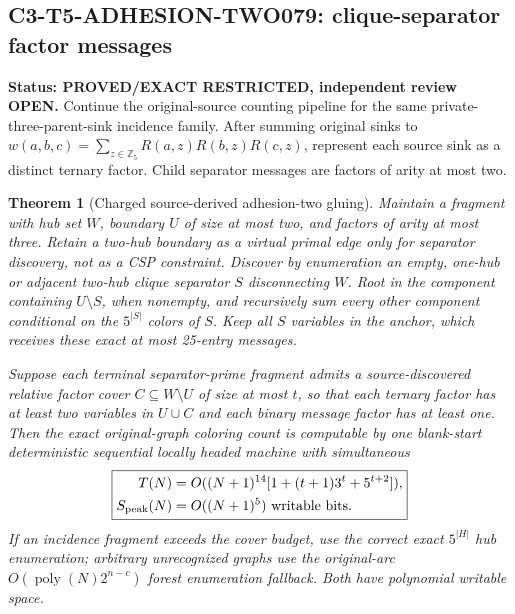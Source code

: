 \documentclass[11pt]{article}
\newtheorem{theorem}{Theorem}
\begin{document}
\subsection*{C3-T5-ADHESION-TWO079: clique-separator factor messages}

\noindent\textbf{Status: PROVED/EXACT RESTRICTED, independent review OPEN.}
Continue the original-source counting pipeline for the same
private-three-parent-sink incidence family. After summing
original sinks to $w(a,b,c)=\sum_{z\in\mathbb Z_5}
R(a,z)R(b,z)R(c,z)$, represent each source sink as a distinct
ternary factor. Child separator messages are factors of
arity at most two.

\begin{theorem}[Charged source-derived adhesion-two gluing]
Maintain a fragment with hub set $W$, boundary $U$ of
size at most two, and factors of arity at most three.
Retain a two-hub boundary as a virtual primal edge only for
separator discovery, not as a CSP constraint. Discover by
enumeration an empty, one-hub or adjacent two-hub clique
separator $S$ disconnecting $W$. Root in the component
containing $U\setminus S$, when nonempty, and recursively
sum every other component conditional on the $5^{|S|}$
colors of $S$. Keep all $S$ variables in the anchor,
which receives these exact at most 25-entry messages.

Suppose each terminal separator-prime fragment admits a
source-discovered relative factor cover
$C\subseteq W\setminus U$ of size at most $t$, so that
each ternary factor has at least two variables in $U\cup C$
and each binary message factor has at least one.
Then the exact original-graph coloring count is computable
by one blank-start deterministic sequential locally headed
machine with simultaneous
\[
\boxed{\begin{aligned}
T(N)&=O((N+1)^{14}[1+(t+1)3^t+5^{t+2}]),\\
S_{\rm peak}(N)&=O((N+1)^5)\text{ writable bits}.
\end{aligned}}
\]
If an incidence fragment exceeds the cover budget, use the
correct exact $5^{|H|}$ hub enumeration; arbitrary unrecognized
graphs use the original-arc $O(\operatorname{poly}(N)2^{n-c})$
forest enumeration fallback. Both have polynomial writable space.
\end{theorem}
\end{document}
